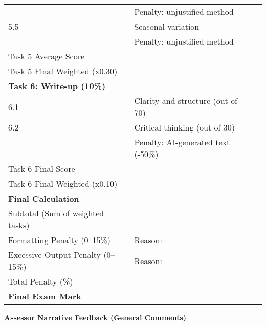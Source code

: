 \documentclass[11pt,a4paper]{article}
\begin{document}
\begin{longtable}{p{}p{}p{}}
    & Penalty: unjustified method & \\
5.5 & Seasonal variation & \\
    & Penalty: unjustified method & \\
Task 5 Average Score & & \\
Task 5 Final Weighted (x0.30) & & \\
\midrule
\multicolumn{3}{l}{\textbf{Task 6: Write-up (10\%)}} \\
6.1 & Clarity and structure (out of 70) & \\
6.2 & Critical thinking (out of 30) & \\
    & Penalty: AI-generated text (-50\%) & \\
Task 6 Final Score & & \\
Task 6 Final Weighted (x0.10) & & \\
\midrule
\multicolumn{3}{l}{\textbf{Final Calculation}} \\
Subtotal (Sum of weighted tasks) & & \\
Formatting Penalty (0–15\%) & Reason: & \\
Excessive Output Penalty (0–15\%) & Reason: & \\
Total Penalty (\textleq 40\%) & & \\
\textbf{Final Exam Mark} & & \\
\bottomrule
\end{longtable}

\vspace{1em}

\noindent
\textbf{Assessor Narrative Feedback (General Comments)}
\hrulefill

\vspace{4em}
\hrulefill

\vspace{4em}
\hrulefill
\end{document}
